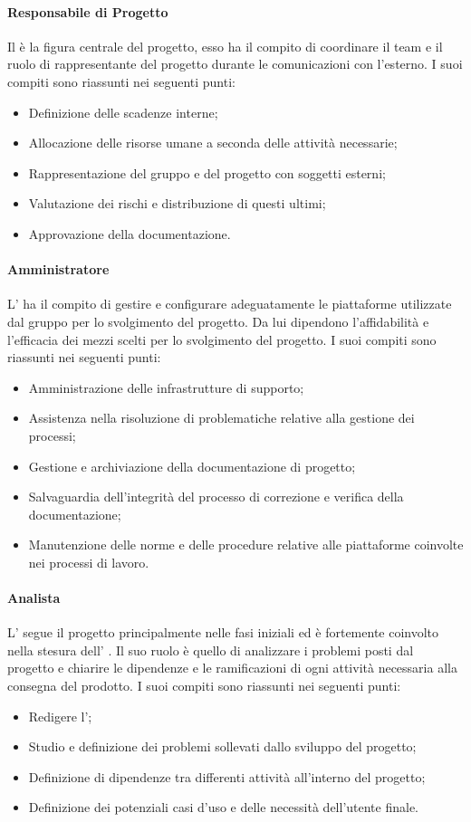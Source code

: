 \paragraph{Responsabile di Progetto}
Il \RdP{} è la figura centrale del progetto, esso ha il compito di coordinare il team e il ruolo di rappresentante del progetto durante le comunicazioni con l'esterno. I suoi compiti sono riassunti nei seguenti punti:
\begin{itemize}
\item Definizione delle scadenze interne;
\item Allocazione delle risorse umane a seconda delle attività necessarie;
\item Rappresentazione del gruppo e del progetto con soggetti esterni;
\item Valutazione dei rischi e distribuzione di questi ultimi;
\item Approvazione della documentazione.
\end{itemize}

\paragraph{Amministratore}
L'\adm{} ha il compito di gestire e configurare adeguatamente le piattaforme utilizzate dal gruppo per lo svolgimento del progetto. Da lui dipendono l'affidabilità e l'efficacia dei mezzi scelti per lo svolgimento del progetto.
I suoi compiti sono riassunti nei seguenti punti:
\begin{itemize}
\item Amministrazione delle infrastrutture di supporto;
\item Assistenza nella risoluzione di problematiche relative alla gestione dei processi;
\item Gestione e archiviazione della documentazione di progetto;
\item Salvaguardia dell'integrità del processo di correzione e verifica della documentazione;
\item Manutenzione delle norme e delle procedure relative alle piattaforme coinvolte nei processi di lavoro.
\end{itemize}

\paragraph{Analista}
L' \ana{} segue il progetto principalmente nelle fasi iniziali ed è fortemente coinvolto nella stesura dell' \AdR{}. Il suo ruolo è quello di analizzare i problemi posti dal progetto e chiarire le dipendenze e le ramificazioni di ogni attività necessaria alla consegna del prodotto.
I suoi compiti sono riassunti nei seguenti punti:
\begin{itemize}
\item Redigere l'\AdR{};
\item Studio e definizione dei problemi sollevati dallo sviluppo del progetto;
\item Definizione di dipendenze tra differenti attività all'interno del progetto;
\item Definizione dei potenziali casi d'uso e delle necessità dell'utente finale.
\end{itemize}

